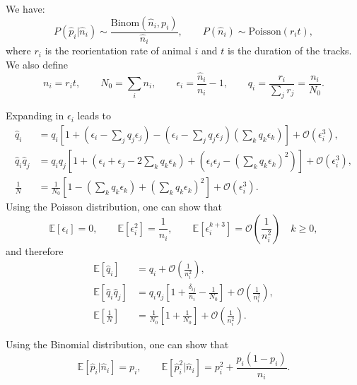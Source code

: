 \documentclass[12pt]{article}
\newcommand{\E}{\mathbb{E}}
\newcommand{\CO}{\mathcal{O}}
\newcommand{\prn}[1]{\left ( #1 \right )}
\newcommand{\brk}[1]{\left [ #1 \right ]}
\begin{document}
We have:
%
\begin{equation}\label{eq:estdist}
  P(\hat{p}_i|\hat{n}_i) \sim \frac{\mathrm{Binom}(\hat{n}_i,p_i)}{\hat{n}_i},
  \qquad
  P(\hat{n}_i) \sim \mathrm{Poisson}(r_it),
\end{equation}
%
where $r_i$ is the reorientation rate of animal $i$ and $t$ is the duration of the tracks. We also define
%
\begin{equation}\label{eq:biasnot}
  n_i = r_it, \qquad
  N_0 = \sum_i n_i, \qquad
  \epsilon_i = \frac{\hat{n}_i}{n_i}-1, \qquad
  q_i = \frac{r_i}{\sum_j r_j} = \frac{n_i}{N_0}.
\end{equation}
%

Expanding in $\epsilon_i$ leads to
%
\begin{equation}\label{eq:expandeps}
  \begin{aligned}
    \hat{q}_i &= q_i\brk{ 1 + \prn{\epsilon_i-\sum_jq_j\epsilon_j} -  \prn{\epsilon_i-\sum_jq_j\epsilon_j} \prn{\sum_kq_k\epsilon_k} } +\CO\prn{\epsilon_i^3}, \\
    \hat{q}_i\hat{q}_j &= q_iq_j\brk{ 1 + \prn{\epsilon_i+\epsilon_j-2\sum_kq_k\epsilon_k} +  \prn{\epsilon_i\epsilon_j-(\sum_kq_k\epsilon_k)^2} }  +\CO\prn{\epsilon_i^3}, \\
    \frac{1}{N} &= \frac{1}{N_0} \brk{ 1 - \prn{\sum_kq_k\epsilon_k} +  \prn{\sum_kq_k\epsilon_k}^2 } +\CO\prn{\epsilon_i^3}.
  \end{aligned}
\end{equation}
%
Using the Poisson distribution, one can show that
%
\begin{equation}\label{eq:expeps}
    \E\brk{\epsilon_i} = 0, \qquad
    \E\brk{\epsilon_i^2} = \frac{1}{n_i}, \qquad
    \E\brk{\epsilon_i^{k+3}} = \CO\prn{\frac{1}{n_i^2}} \quad k\geq0,
\end{equation}
%
and therefore
%
\begin{equation}\label{eq:expandepsex}
  \begin{aligned}
    \E\brk{\hat{q}_i} &= q_i + \CO\prn{\frac{1}{n_i^2}}, \\
    \E\brk{\hat{q}_i\hat{q}_j} &= q_iq_j\brk{ 1 + \frac{\delta_{ij}}{n_i} -  \frac{1}{N_0}}  + \CO\prn{\frac{1}{n_i^2}}, \\
    \E\brk{\frac{1}{N}} &= \frac{1}{N_0} \brk{ 1  +  \frac{1}{N_0} } + \CO\prn{\frac{1}{n_i^2}}.
  \end{aligned}
\end{equation}
%

Using the Binomial distribution, one can show that
%
\begin{equation}\label{eq:expi}
  \E\brk{\hat{p}_i|\hat{n}_i} = p_i, \qquad
  \E\brk{\hat{p}_i^2|\hat{n}_i} = p_i^2 + \frac{p_i(1-p_i)}{n_i}.
\end{equation}
%
\end{document}

